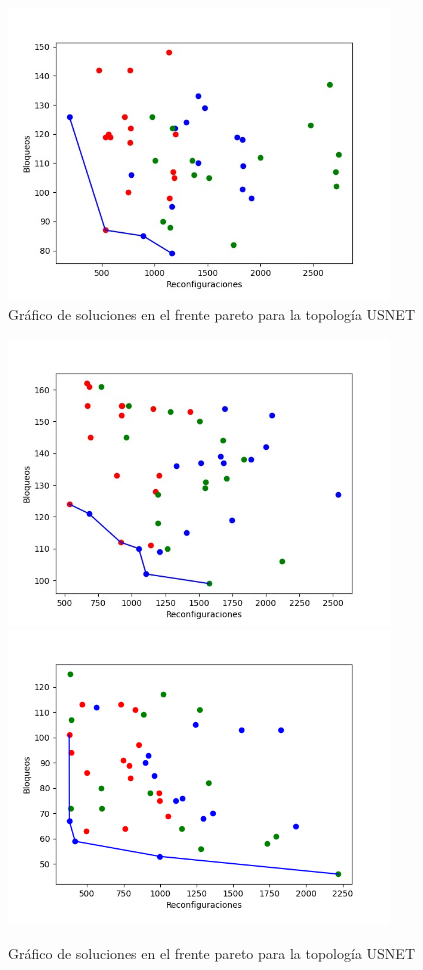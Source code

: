 \begin{itemize}
 \begin{figure}[H]
    \centering
    \includegraphics[width=0.9\textwidth]{capitulos/img/paretoUsnetSB.jpg}
    \caption{Gráfico de soluciones en el frente pareto para la topología USNET}
 \end{figure}
\begin{figure}[H] \ContinuedFloat
    \centering
    \includegraphics[width=0.9\textwidth]{capitulos/img/paretoUsnetSBSB.jpeg}
    \includegraphics[width=0.9\textwidth]{capitulos/img/paretoUsnetSBS.png}
    \caption{Gráfico de soluciones en el frente pareto para la topología USNET}
    \label{fig:paretoUSNET}
\end{figure}
\newpage


\end{itemize}

